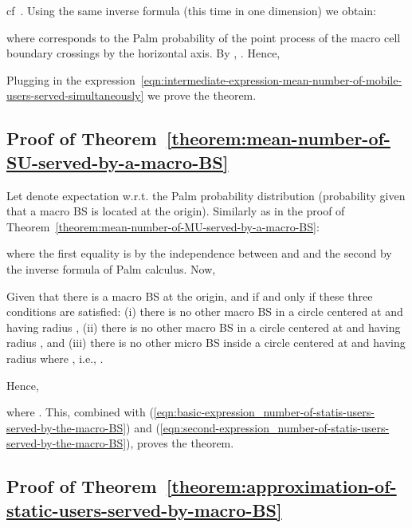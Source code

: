 \documentclass[10pt,journal]{IEEEtran}
\begin{document}
cf~\cite[Equations~ with ]{okabe99spatial-tesselations}.
Using the same inverse formula (this time in one dimension)
we obtain:

where  corresponds to the Palm probability of the
point process of the macro cell boundary crossings by the horizontal
 axis. 
By \cite[Table~]{okabe99spatial-tesselations},
. 
Hence, 
 
Plugging in the expression~\eqref{eqn:intermediate-expression-mean-number-of-mobile-users-served-simultaneously}
we prove the theorem.

 
 \subsection{Proof of Theorem~\ref{theorem:mean-number-of-SU-served-by-a-macro-BS}}
 \label{subsection:proof-of-mean-number-of-SU-served-by-a-macro-BS}
Let  
denote expectation w.r.t. the Palm probability distribution  (probability 
given that a macro BS is located at the origin). 
Similarly as in the proof of 
Theorem~\ref{theorem:mean-number-of-MU-served-by-a-macro-BS}:

\footnotesize

\normalsize
where the  first equality is by the independence between
 and  and  the second by the inverse formula
of Palm calculus. Now, 

\footnotesize

\normalsize
Given that there is a macro BS at the origin, 
 and  if and only if these three conditions are satisfied: 
(i) there is no other macro BS in a circle centered at  and having radius , (ii) there is no 
other macro BS in a circle centered at  and having radius , and 
(iii) there is no 
other micro BS inside a circle centered at  and having radius  where , i.e., 
.

Hence, 

where . This, combined with 
(\ref{eqn:basic-expression_number-of-statis-users-served-by-the-macro-BS}) and 
(\ref{eqn:second-expression_number-of-statis-users-served-by-the-macro-BS}), proves the theorem.






\subsection{Proof of Theorem~\ref{theorem:approximation-of-static-users-served-by-macro-BS}}
\label{subsection:proof-of-approximation-of-static-users-served-by-macro-BS}
\end{document}
